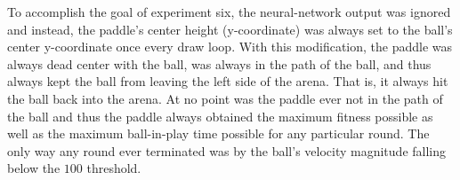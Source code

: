 To accomplish the goal of experiment six, the neural-network output was ignored and instead, the paddle's center height (y-coordinate) was always set to the ball's center y-coordinate once every draw loop. With this modification, the paddle was always dead center with the ball, was always in the path of the ball, and thus always kept the ball from leaving the left side of the arena. That is, it always hit the ball back into the arena. At no point was the paddle ever not in the path of the ball and thus the paddle always obtained the maximum fitness possible as well as the maximum ball-in-play time possible for any particular round. The only way any round ever terminated was by the ball's velocity magnitude falling below the $100$ threshold.  


